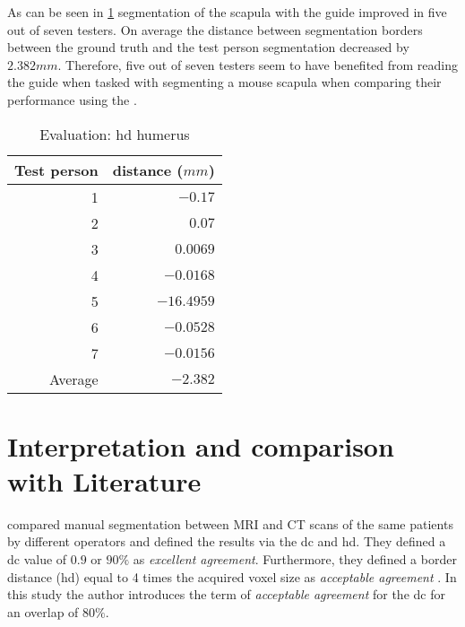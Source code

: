 \noindent
As can be seen in \cref{tab:humerus-distance} segmentation of the scapula with the guide improved in five out of seven testers.
On average the distance between segmentation borders between the ground truth and the test person segmentation decreased by $2.382mm$.
Therefore, five out of seven testers seem to have benefited from reading the guide when tasked with segmenting a mouse scapula when comparing their performance using the .
\begin{table}[ht]
	\begin{center}
		\begin{tabular}{r r}
			\textbf{Test person} & \textbf{distance ($mm$)} \\
			\hline
			1                    & $-0.17$                  \\
			2                    & $0.07$                   \\
			3                    & $0.0069$                 \\
			4                    & $-0.0168$                \\
			5                    & $-16.4959$               \\
			6                    & $-0.0528$                \\
			7                    & $-0.0156$                \\
			\hline
			Average              & $-2.382$                 \\
		\end{tabular}
		\caption{Evaluation: \acrshort{hd} humerus}\label{tab:humerus-distance}
	\end{center}
\end{table}

\section{Interpretation and comparison with Literature}
 compared manual segmentation between MRI and CT scans of the same patients by different operators and defined the results via the \acrlong{dc} and \acrlong{hd}.
They defined a \acrshort{dc} value of $0.9$ or $90\%$ as \textit{excellent agreement}.
Furthermore, they defined a border distance (\acrshort{hd}) equal to 4 times the acquired voxel size as \textit{acceptable agreement} \cite{andersenAccuracyPrecisionManual2018}.
In this study the author introduces the term of \textit{acceptable agreement} for the \acrshort{dc} for an overlap of $80\%$.

